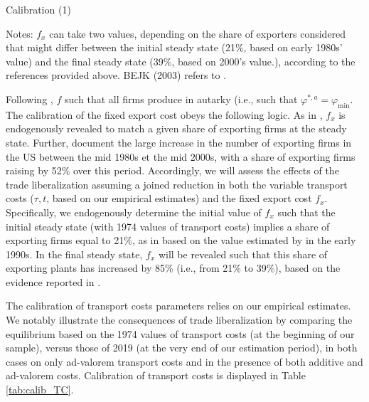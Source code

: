 \documentclass[a4paper,11pt]{article}
\begin{document}
\begin{table}[htbp]
  \centering
  \caption{Calibration (1)} \label{tab:calib_horsTC}
\begin{center}
	
\end{center}
{\parbox[l]{10cm}{ \vspace{4pt}\footnotesize{Notes: $f_x$ can take two values, depending on the share of exporters considered that might differ between the initial steady state (21\%, based on early 1980s' value) and the final steady state (39\%, based on 2000's value.), according to the references provided above. BEJK (2003) refers to \cite{BEJK-AER-03}.}}}
\end{table}



Following \cite{ghironi}, $f$ such that all firms produce in autarky (i.e., such that $\varphi^{\ast,a} = \varphi_{\text{min}}$. The calibration of the fixed export cost obeys the following logic. As in \cite{ghironi}, $f_x$ is endogenously revealed to match a given share of exporting firms at the steady state. Further, \cite{Lincoln_McCallum2018} document the large increase in the number of exporting firms in the US between the mid 1980s et the mid 2000s, with a share of exporting firms raising by 52\% over this period. Accordingly, we will assess the effects of the trade liberalization assuming a joined reduction in both the variable transport costs ($\tau, t$, based on our empirical estimates) and the fixed export cost $f_x$. Specifically, we endogenously determine the initial value of $f_x$ such that the initial steady state (with 1974 values of transport costs) implies a share of exporting firms equal to 21\%, as in  \cite{ghironi} based on the value estimated by \cite{BEJK-AER-03} in the early 1990s. In the final steady state, $f_x$ will be revealed such that this share of exporting plants has increased by 85\% (i.e., from 21\% to 39\%), based on the evidence reported in \cite{Lincoln_McCallum2018}.\smallskip

The calibration of transport costs parameters relies on our empirical estimates. We notably illustrate the consequences of trade liberalization by comparing the equilibrium based on the 1974 values of transport costs (at the beginning of our sample), versus those of 2019 (at the very end of our estimation period), in both cases on only ad-valorem transport costs and in the presence of both additive and ad-valorem costs. Calibration of transport costs is displayed in Table \ref{tab:calib_TC}.
\end{document}
